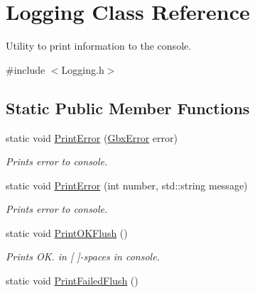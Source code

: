 \hypertarget{classLogging}{\section{Logging Class Reference}
\label{classLogging}
}


Utility to print information to the console.  




{\ttfamily \#include $<$Logging.\-h$>$}

\subsection*{Static Public Member Functions}
\begin{DoxyCompactItemize}
\item 
static void \hyperlink{classLogging_a7d4e2168b879a66d322d0b4fb2b298c4}{Print\-Error} (\hyperlink{structGbxError}{Gbx\-Error} error)
\begin{DoxyCompactList}\small\item\em Prints error to console. \end{DoxyCompactList}\item 
static void \hyperlink{classLogging_ac1397db1b8ea6625f7dd2616f530cd7d}{Print\-Error} (int number, std\-::string message)
\begin{DoxyCompactList}\small\item\em Prints error to console. \end{DoxyCompactList}\item 
\hypertarget{classLogging_a889f2ad8f991afdf0959cb1cad736fa7}{static void \hyperlink{classLogging_a889f2ad8f991afdf0959cb1cad736fa7}{Print\-O\-K\-Flush} ()}\label{classLogging_a889f2ad8f991afdf0959cb1cad736fa7}

\begin{DoxyCompactList}\small\item\em Prints O\-K. in \mbox{[} \mbox{]}-\/spaces in console. \end{DoxyCompactList}\item 
\hypertarget{classLogging_add0483bd14aef74ec988606cd7dbfc4b}{static void \hyperlink{classLogging_add0483bd14aef74ec988606cd7dbfc4b}{Print\-Failed\-Flush} ()}\label{classLogging_add0483bd14aef74ec988606cd7dbfc4b}


\end{DoxyCompactItemize}
